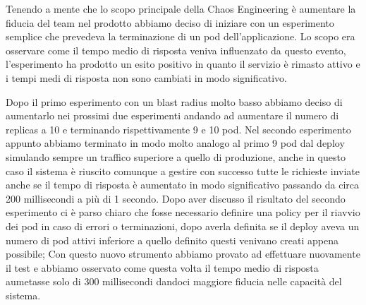 Tenendo a mente che lo scopo principale della Chaos Engineering è aumentare la fiducia del team nel prodotto abbiamo deciso di iniziare con un esperimento semplice che prevedeva la terminazione di un pod dell'applicazione.
Lo scopo era osservare come il tempo medio di risposta veniva influenzato da questo evento, l'esperimento ha prodotto un esito positivo in quanto il servizio è rimasto attivo e i tempi medi di risposta non sono cambiati in modo significativo.


Dopo il primo esperimento con un blast radius molto basso abbiamo deciso di aumentarlo nei prossimi due esperimenti andando ad aumentare il numero di replicas a 10 e terminando rispettivamente 9 e 10 pod.
Nel secondo esperimento appunto abbiamo terminato in modo molto analogo al primo 9 pod dal deploy simulando sempre un traffico superiore a quello di produzione, anche in questo caso il sistema è riuscito comunque a gestire con successo tutte le richieste inviate anche se il tempo di risposta è aumentato in modo significativo passando da circa 200 millisecondi a più di 1 secondo.
Dopo aver discusso il risultato del secondo esperimento ci è parso chiaro che fosse necessario definire una policy per il riavvio dei pod in caso di errori o terminazioni, dopo averla definita se il deploy aveva un numero di pod attivi inferiore a quello definito questi venivano creati appena possibile; Con questo nuovo strumento abbiamo provato ad effettuare nuovamente il test e abbiamo osservato come questa volta il tempo medio di risposta aumetasse solo di 300 millisecondi dandoci maggiore fiducia nelle capacità del sistema.


